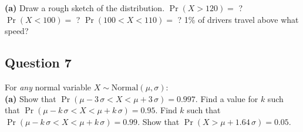 {\bf(a)} Draw a rough sketch of the distribution.  $\Pr(X>120)=$ ?  $\Pr(X<100)=$ ?  $\Pr(100<X<110)=$ ?  1\% of drivers travel above what speed?







\subsection*{Question 7}
For \emph{any} normal variable $X \sim \text{Normal}(\mu,\sigma)$:\\[-0.2cm]

{\bf(a)} Show that $\Pr(\mu-3\,\sigma<X<\mu+3\,\sigma) = 0.997$.  Find a value for $k$ such that $\Pr(\mu-k\,\sigma<X<\mu+k\,\sigma) = 0.95$.  Find $k$ such that $\Pr(\mu-k\,\sigma<X<\mu+k\,\sigma) = 0.99$.  Show that $\Pr(X>\mu+1.64\,\sigma) = 0.05.$

